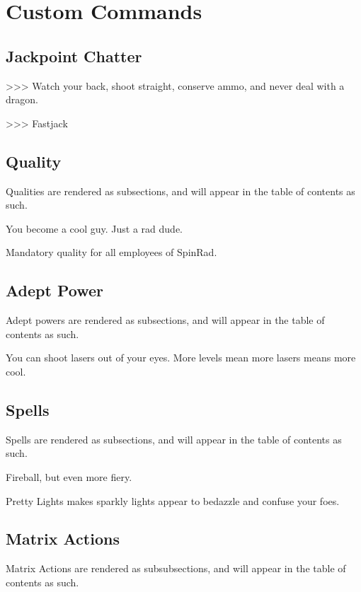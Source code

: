 \documentclass[red, openany, logo-1e]{shadowrun}
\begin{document}
\chapter{Custom Commands}

\section{Jackpoint Chatter}
\begin{chatter}
    >>> Watch your back, shoot straight, conserve ammo, and never deal with a dragon.

    >>> Fastjack
\end{chatter}

\section{Quality}
Qualities are rendered as subsections, and will appear in the table of contents as such.

{
    You become a cool guy. Just a rad dude.

    Mandatory quality for all employees of SpinRad.
}

\section{Adept Power}
Adept powers are rendered as subsections, and will appear in the table of contents as such.

{
    You can shoot lasers out of your eyes. More levels mean more lasers means more cool.
}

\section{Spells}
Spells are rendered as subsections, and will appear in the table of contents as such.

{
    Fireball, but even more fiery.
}

{
    Pretty Lights makes sparkly lights appear to bedazzle and confuse your foes.
}

\section{Matrix Actions}
Matrix Actions are rendered as subsubsections, and will appear in the table of contents as such.
\end{document}
